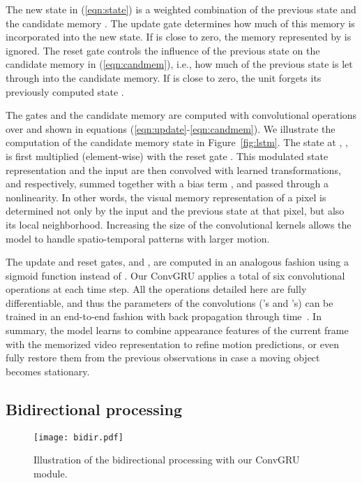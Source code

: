 \documentclass[10pt,twocolumn,letterpaper]{article}
\begin{document}
The new state  in (\ref{eqn:state}) is a weighted combination of the
previous state  and the candidate memory . The update
gate  determines how much of this memory is incorporated into the new
state. If  is close to zero, the memory represented by  is
ignored. The reset gate  controls the influence of the previous state
 on the candidate memory  in (\ref{eqn:candmem}), i.e.,
how much of the previous state is let through into the candidate memory. If
 is close to zero, the unit forgets its previously computed state
.

The gates and the candidate memory are computed with convolutional operations
over  and  shown in equations
(\ref{eqn:update}-\ref{eqn:candmem}). We illustrate the computation of the
candidate memory state  in Figure~\ref{fig:lstm}.  The state at
, , is first multiplied (element-wise) with the reset gate .
This modulated state representation and the input  are then convolved with
learned transformations,  and  respectively,
summed together with a bias term , and passed through a 
nonlinearity. In other words, the visual memory representation of a pixel is
determined not only by the input and the previous state at that pixel, but also
its local neighborhood. Increasing the size of the convolutional kernels allows
the model to handle spatio-temporal patterns with larger motion.

The update and reset gates,  and , are computed in an analogous
fashion using a sigmoid function instead of . Our ConvGRU applies a
total of six convolutional operations at each time step. All the operations
detailed here are fully differentiable, and thus the parameters of the
convolutions ('s and 's) can be trained in an end-to-end fashion with
back propagation through time~\cite{werbos1990backpropagation}. In summary, the
model learns to combine appearance features of the current frame with the
memorized video representation to refine motion predictions, or even fully
restore them from the previous observations in case a moving object becomes
stationary.

\subsection{Bidirectional processing}
\label{sec:bidirec}
\begin{figure}[t]
\begin{center}
\texttt{[image: bidir.pdf]}
\end{center}
\vspace{-0.3cm}
\caption{Illustration of the bidirectional processing with our ConvGRU module.}
\vspace{-0.3cm}
\label{fig:bidir}
\end{figure}
\end{document}
